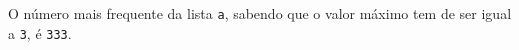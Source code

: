 \documentclass[12pt,varwidth=16cm,border=1pt]{standalone}
\begin{document}
O número mais frequente da lista \verb+a+, sabendo que o valor máximo tem de ser igual a \verb+3+, é \verb+333+.

\questiomfalse
\end{document}
